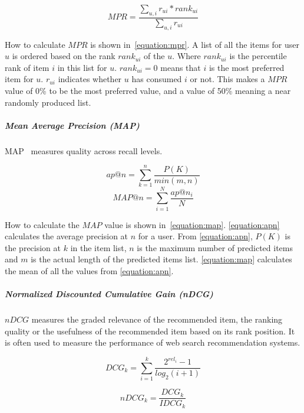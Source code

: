 \begin{equation}
	MPR = \frac{\sum_{u,i}{r_{ui} * rank_{ui}}}{\sum_{u,i}{r_{ui}}}
	\label{equation:mpr}
\end{equation}

How to calculate $MPR$ is shown in~\ref{equation:mpr}.  A list of all the items
for user $u$ is ordered based on the rank $rank_{ui}$ of the $u$.  Where
$rank_{ui}$ is the percentile rank of item $i$ in this list for $u$.
$rank_{ui} = 0$ means that $i$ is the most preferred item for $u$.  $r_{ui}$
indicates whether $u$ has consumed $i$ or not.  This makes a $MPR$ value of
0\% to be the most preferred value, and a value of 50\% meaning a near
randomly produced list.

\subparagraph{Mean Average Precision (MAP)}
\label{subp:mean_average_precision_map_}

MAP~\cite{Manning:2008:IIR:1394399} measures quality across recall levels.

\begin{equation}
	ap@n = \sum_{k=1}^{n}{\frac{P(K)}{min(m,n)}}
	\label{equation:apn}
\end{equation}
\begin{equation}
	MAP@n = \sum_{i=1}^{N}{\frac{ap@n_i}{N}}
	\label{equation:map}
\end{equation}

How to calculate the $MAP$ value is shown in~\ref{equation:map}.
\ref{equation:apn} calculates the average precision at $n$ for a user.  From
\ref{equation:apn}, $P(K)$ is the precision at $k$ in the item list, $n$ is the
maximum number of predicted items and $m$ is the actual length of the predicted
items list.  \ref{equation:map} calculates the mean of all the values from
\ref{equation:apn}.

\subparagraph{Normalized Discounted Cumulative Gain (nDCG)}
\label{subp:normalized_discounted_cumulative_gain_}

$nDCG$ measures the graded relevance of the recommended item, the ranking
quality or the usefulness of the recommended item based on its rank position.
It is often used to measure the performance of web search recommendation
systems.

\begin{equation}
    DCG_k = \sum_{i=1}^{k}{\frac{2^{rel_i}-1}{log_2(i+1)}}
    \label{equation:dcg}
\end{equation}

\begin{equation}
    nDCG_k = \frac{DCG_k}{IDCG_k}
    \label{equation:ndcg}
\end{equation}


